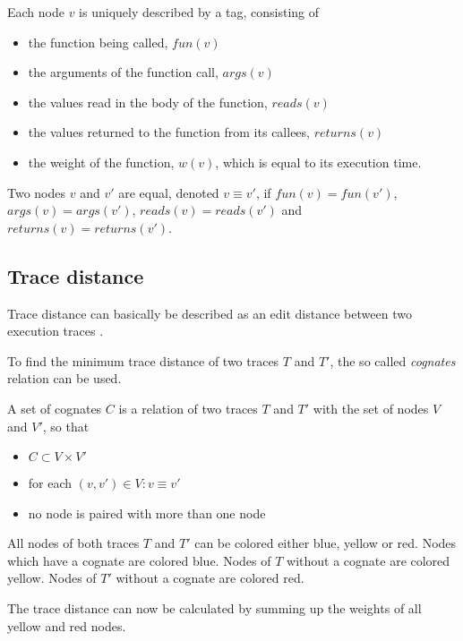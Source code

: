 \begin{definition}
Each node $v$ is uniquely described by a tag, consisting of

\begin{itemize}
\item the function being called, $fun(v)$
\item the arguments of the function call, $args(v)$
\item the values read in the body of the function, $reads(v)$
\item the values returned to the function from its callees, $returns(v)$
\item the weight of the function, $w(v)$, which is equal to its execution time.
\end{itemize}

Two nodes $v$ and $v'$ are equal, denoted $v \equiv v'$, if $fun(v) = fun(v')$, $args(v) = args(v')$, $reads(v) = reads(v')$ and $returns(v) = returns(v')$.
\end{definition}

\subsection{Trace distance}
Trace distance can basically be described as an edit distance between two execution traces \cite{Acar2005thesis} \cite{acar2004dynamizing}. 

To find the minimum trace distance of two traces $T$ and $T'$, the so called \textit{cognates} relation can be used. 

\begin{definition}[Cognates]
A set of cognates $C$ is a relation of two traces $T$ and $T'$ with the set of nodes $V$ and $V'$, so that

\begin{itemize}
\item $C \subset V \times V'$
\item for each $(v, v') \in V: v \equiv v'$ 
\item no node is paired with more than one node
\end{itemize}
\end{definition}
All nodes of both traces $T$ and $T'$ can be colored either blue, yellow or red. 
Nodes which have a cognate are colored blue. Nodes of $T$ without a cognate are colored yellow. Nodes of $T'$ without a cognate are colored red. 

The trace distance can now be calculated by summing up the weights of all yellow and red nodes. 

